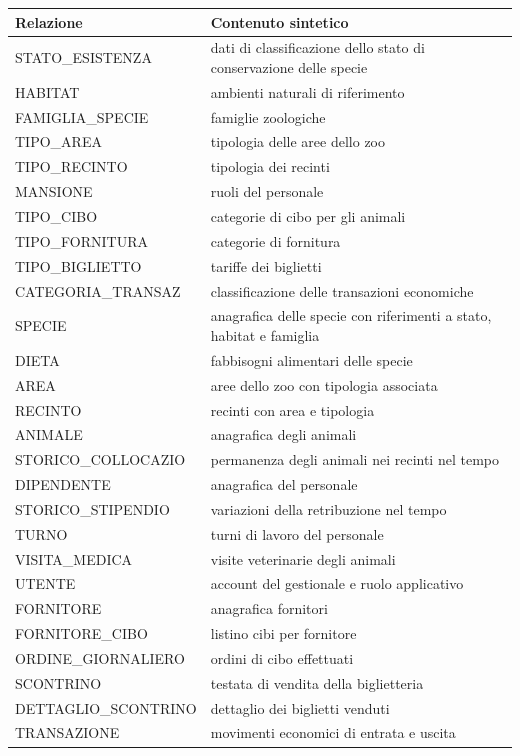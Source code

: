 \documentclass[12pt,a4paper]{report}
\begin{document}
\begin{longtable}{L{5cm} L{8.5cm}}
\toprule
\textbf{Relazione} & \textbf{Contenuto sintetico} \\
\midrule
\endhead
STATO\_ESISTENZA & dati di classificazione dello stato di conservazione delle specie \\
HABITAT & ambienti naturali di riferimento \\
FAMIGLIA\_SPECIE & famiglie zoologiche \\
TIPO\_AREA & tipologia delle aree dello zoo \\
TIPO\_RECINTO & tipologia dei recinti \\
MANSIONE & ruoli del personale \\
TIPO\_CIBO & categorie di cibo per gli animali \\
TIPO\_FORNITURA & categorie di fornitura \\
TIPO\_BIGLIETTO & tariffe dei biglietti \\
CATEGORIA\_TRANSAZ & classificazione delle transazioni economiche \\
SPECIE & anagrafica delle specie con riferimenti a stato, habitat e famiglia \\
DIETA & fabbisogni alimentari delle specie \\
AREA & aree dello zoo con tipologia associata \\
RECINTO & recinti con area e tipologia \\
ANIMALE & anagrafica degli animali \\
STORICO\_COLLOCAZIO & permanenza degli animali nei recinti nel tempo \\
DIPENDENTE & anagrafica del personale \\
STORICO\_STIPENDIO & variazioni della retribuzione nel tempo \\
TURNO & turni di lavoro del personale \\
VISITA\_MEDICA & visite veterinarie degli animali \\
UTENTE & account del gestionale e ruolo applicativo \\
FORNITORE & anagrafica fornitori \\
FORNITORE\_CIBO & listino cibi per fornitore \\
ORDINE\_GIORNALIERO & ordini di cibo effettuati \\
SCONTRINO & testata di vendita della biglietteria \\
DETTAGLIO\_SCONTRINO & dettaglio dei biglietti venduti \\
TRANSAZIONE & movimenti economici di entrata e uscita \\
\bottomrule
\end{longtable}
\end{document}
